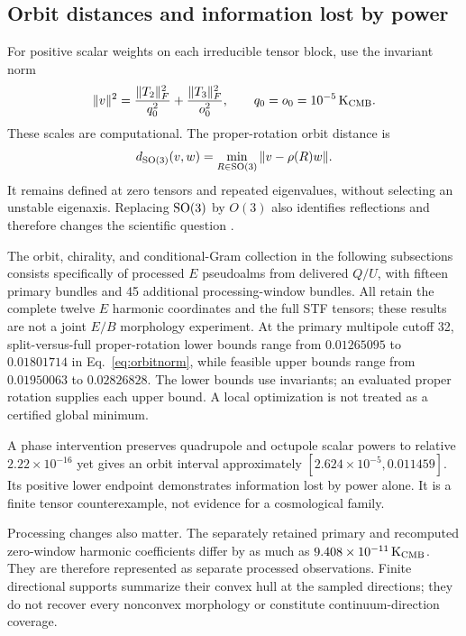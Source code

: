 \subsection{Orbit distances and information lost by power}

For positive scalar weights on each irreducible tensor block, use the invariant norm
\begin{equation}
 \|v\|^2=\frac{\|T_2\|_F^2}{q_0^2}+\frac{\|T_3\|_F^2}{o_0^2},
 \qquad q_0=o_0=10^{-5}\,\mathrm K_{\rm CMB}.
 \label{eq:orbitnorm}
\end{equation}
These scales are computational. The proper-rotation orbit distance is
\begin{equation}
 d_{\mathrm{SO}(3)}(v,w)=\min_{R\in\mathrm{SO}(3)}\|v-\rho(R)w\|.
 \label{eq:orbit}
\end{equation}
It remains defined at zero tensors and repeated eigenvalues, without selecting an unstable eigenaxis. Replacing $\mathrm{SO}(3)$ by $O(3)$ also identifies reflections and therefore changes the scientific question \cite{LandMagueijo2005}.

The orbit, chirality, and conditional-Gram collection in the following subsections consists specifically of processed $E$ pseudoalms from delivered $Q/U$, with fifteen primary bundles and 45 additional processing-window bundles. All retain the complete twelve $E$ harmonic coordinates and the full STF tensors; these results are not a joint $E/B$ morphology experiment. At the primary multipole cutoff 32, split-versus-full proper-rotation lower bounds range from $0.01265095$ to $0.01801714$ in Eq.~\eqref{eq:orbitnorm}, while feasible upper bounds range from $0.01950063$ to $0.02826828$. The lower bounds use invariants; an evaluated proper rotation supplies each upper bound. A local optimization is not treated as a certified global minimum.

A phase intervention preserves quadrupole and octupole scalar powers to relative $2.22\times10^{-16}$ yet gives an orbit interval approximately $[2.624\times10^{-5},0.011459]$. Its positive lower endpoint demonstrates information lost by power alone. It is a finite tensor counterexample, not evidence for a cosmological family.

Processing changes also matter. The separately retained primary and recomputed zero-window harmonic coefficients differ by as much as $9.408\times10^{-11}\,\mathrm K_{\rm CMB}$. They are therefore represented as separate processed observations. Finite directional supports summarize their convex hull at the sampled directions; they do not recover every nonconvex morphology or constitute continuum-direction coverage.

